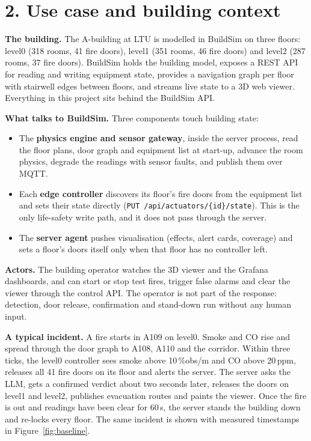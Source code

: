 \documentclass[11pt]{article}
\providecommand{\tightlist}{\setlength{\itemsep}{0pt}\setlength{\parskip}{0pt}}
\begin{document}
\section{2. Use case and building context}

\textbf{The building.} The A-building at LTU is modelled in BuildSim on three floors: 
level0 (318 rooms, 41 fire doors), level1 (351 rooms, 46 fire doors) and level2 (287 rooms, 37 fire doors). 
BuildSim holds the building model, exposes a REST API for reading and writing equipment state, 
provides a navigation graph per floor with stairwell edges between floors, and streams live state 
to a 3D web viewer. Everything in this project sits behind the BuildSim API.

\textbf{What talks to BuildSim.} Three components touch building state:
\begin{itemize}\tightlist
  \item The \textbf{physics engine and sensor gateway}, inside the server process, read the floor plans, 
  door graph and equipment list at start-up, advance the room physics, degrade the readings with 
  sensor faults, and publish them over MQTT.
  \item Each \textbf{edge controller} discovers its floor's fire doors from the equipment list and sets 
  their state directly (\texttt{PUT /api/actuators/\{id\}/state}). This is the only life-safety write 
  path, and it does not pass through the server.
  \item The \textbf{server agent} pushes visualisation (effects, alert cards, coverage) and sets a 
  floor's doors itself only when that floor has no controller left.
\end{itemize}

\textbf{Actors.} The building operator watches the 3D viewer and the Grafana dashboards, and can start 
or stop test fires, trigger false alarms and clear the viewer through the control API. The operator 
is not part of the response: detection, door release, confirmation and stand-down run without 
any human input.

\textbf{A typical incident.} A fire starts in A109 on level0. Smoke and CO rise and spread through 
the door graph to A108, A110 and the corridor. Within three ticks, the level0 controller sees smoke 
above 10\,\%obs/m and CO above 20\,ppm, releases all 41 fire doors on its floor and alerts the server. 
The server asks the LLM, gets a confirmed verdict about two seconds later, releases the doors on 
level1 and level2, publishes evacuation routes and paints the viewer. Once the fire is out and 
readings have been clear for 60\,s, the server stands the building down and re-locks every floor. 
The same incident is shown with measured timestamps in Figure~\ref{fig:baseline}.
\end{document}
